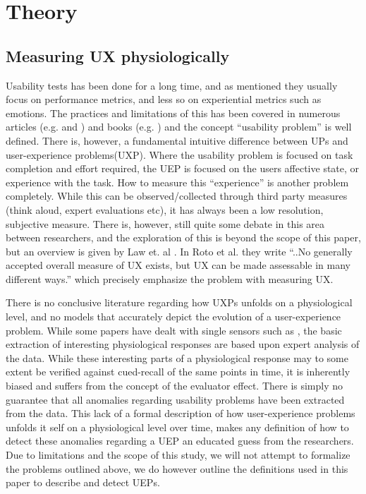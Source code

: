 \section{Theory}
\subsection{Measuring UX physiologically}
Usability tests has been done for a long time, and as mentioned they usually focus on performance metrics, and less so
on experiential metrics such as emotions. 
The practices and limitations of this has been covered in numerous articles (e.g. \cite{usability_eval} and \cite{eval_effect}) and books (e.g. \cite{guide_to_upeval}) and the concept ``usability problem'' is well defined.
There is, however, a fundamental intuitive difference between UPs and user-experience problems(UXP). 
Where the usability problem is focused on task completion and effort required, the UEP is focused on the users affective state, or experience with the task.
How to measure this ``experience'' is another problem completely.
While this can be observed/collected through third party measures (think aloud, expert evaluations etc), it has always been a low resolution, subjective measure. 
There is, however, still quite some debate in this area between researchers, and the exploration of this is beyond the scope of this paper, but an overview is given by Law et. al \cite{attitudes_ux_measure}. 
In Roto et al. \cite{what_is_ux} they write ``..No generally accepted overall measure of UX exists, but UX can be made assessable in many different ways.'' which precisely emphasize the problem with measuring UX. 

There is no conclusive literature regarding how UXPs unfolds on a physiological level, and no models that accurately depict the evolution of a user-experience problem. 
While some papers have dealt with single sensors such as \cite{mind_the_gap} \cite{LH-paper}, the basic extraction of interesting physiological responses are based upon expert analysis of the data.
While these interesting parts of a physiological response may to some extent be verified against cued-recall of the same points in time, it is inherently biased and suffers from the concept of the evaluator effect. 
There is simply no guarantee that all anomalies regarding usability problems have been extracted from the data.
This lack of a formal description of how user-experience problems unfolds it self on a physiological level over time, makes any definition of how to detect these anomalies regarding a UEP an educated guess from the researchers.
Due to limitations and the scope of this study, we will not attempt to formalize the problems outlined above, we do however outline the definitions used in this paper to describe and detect UEPs.

